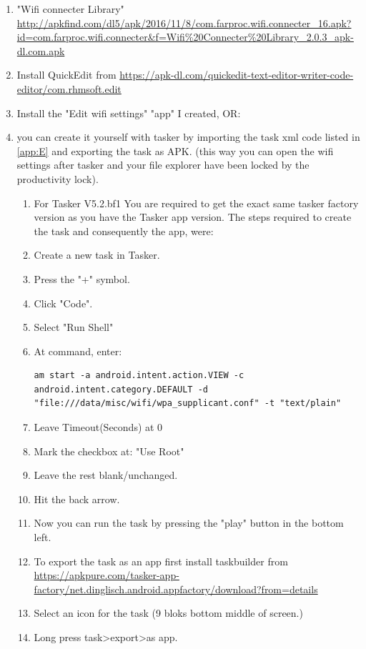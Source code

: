 \begin{enumerate}
    \item "Wifi connecter Library" \url{http://apkfind.com/dl5/apk/2016/11/8/com.farproc.wifi.connecter_16.apk?id=com.farproc.wifi.connecter&f=Wifi%20Connecter%20Library_2.0.3_apk-dl.com.apk}
    \item Install QuickEdit from \url{https://apk-dl.com/quickedit-text-editor-writer-code-editor/com.rhmsoft.edit}
    \item Install the "Edit wifi settings" "app" I created, OR:
    \item you can create it yourself with tasker by importing the task xml code listed in \cref{app:E} and exporting the task as APK. (this way you can open the wifi settings after tasker and your file explorer have been locked by the productivity lock).
    \begin{enumerate}
        \item For Tasker V5.2.bf1 You are required to get the exact same tasker factory version as you have the Tasker app version. The steps required to create the task and consequently the app, were: 
        \item Create a new task in Tasker. 
        \item Press the "+" symbol. 
        \item Click "Code". 
        \item Select "Run Shell" 
        \item At command, enter:
\begin{verbatim}
am start -a android.intent.action.VIEW -c android.intent.category.DEFAULT -d "file:///data/misc/wifi/wpa_supplicant.conf" -t "text/plain"    
\end{verbatim}        
        \item Leave Timeout(Seconds) at 0 
        \item Mark the checkbox at: "Use Root" 
        \item Leave the rest blank/unchanged. 
        \item Hit the back arrow. 
        \item Now you can run the task by pressing the "play" button in the bottom left.
        \item To export the task as an app first install taskbuilder from \url{https://apkpure.com/tasker-app-factory/net.dinglisch.android.appfactory/download?from=details}
        \item Select an icon for the task (9 bloks bottom middle of screen.)
        \item Long press task>export>as app.

\end{enumerate}
\end{enumerate}

